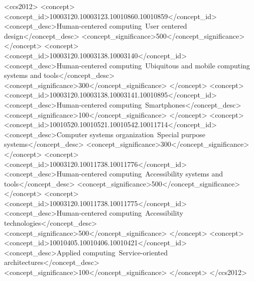 \documentclass[manuscript]{acmart}
\begin{document}
%

%
%
\begin{CCSXML}
<ccs2012>
   <concept>
       <concept_id>10003120.10003123.10010860.10010859</concept_id>
       <concept_desc>Human-centered computing~User centered design</concept_desc>
       <concept_significance>500</concept_significance>
       </concept>
   <concept>
       <concept_id>10003120.10003138.10003140</concept_id>
       <concept_desc>Human-centered computing~Ubiquitous and mobile computing systems and tools</concept_desc>
       <concept_significance>300</concept_significance>
       </concept>
   <concept>
       <concept_id>10003120.10003138.10003141.10010895</concept_id>
       <concept_desc>Human-centered computing~Smartphones</concept_desc>
       <concept_significance>100</concept_significance>
       </concept>
   <concept>
       <concept_id>10010520.10010521.10010542.10011714</concept_id>
       <concept_desc>Computer systems organization~Special purpose systems</concept_desc>
       <concept_significance>300</concept_significance>
       </concept>
   <concept>
       <concept_id>10003120.10011738.10011776</concept_id>
       <concept_desc>Human-centered computing~Accessibility systems and tools</concept_desc>
       <concept_significance>500</concept_significance>
       </concept>
   <concept>
       <concept_id>10003120.10011738.10011775</concept_id>
       <concept_desc>Human-centered computing~Accessibility technologies</concept_desc>
       <concept_significance>500</concept_significance>
       </concept>
   <concept>
       <concept_id>10010405.10010406.10010421</concept_id>
       <concept_desc>Applied computing~Service-oriented architectures</concept_desc>
       <concept_significance>100</concept_significance>
       </concept>
 </ccs2012>
\end{CCSXML}

\end{document}
